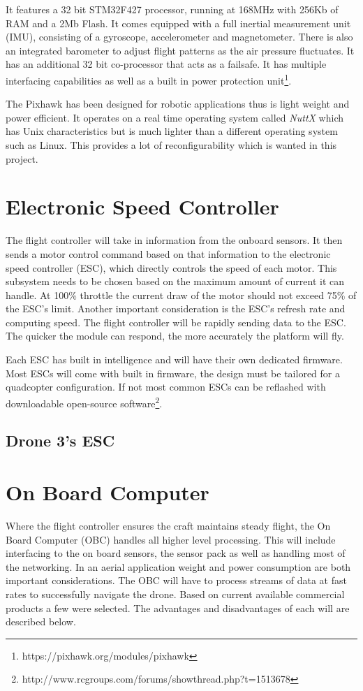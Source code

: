			It features a 32 bit STM32F427 processor, running at 168MHz with 256Kb of RAM and a 2Mb Flash. It comes equipped with a full inertial measurement unit (IMU), consisting of a gyroscope, accelerometer and magnetometer. There is also an integrated barometer to adjust flight patterns as the air pressure fluctuates. It has an additional 32 bit co-processor that acts as a failsafe. It has multiple interfacing capabilities as well as a built in power protection unit\footnote{https://pixhawk.org/modules/pixhawk}. 
			
			The Pixhawk has been designed for robotic applications thus is light weight and power efficient. It operates on a real time operating system called \textit{NuttX} which has Unix characteristics but is much lighter than a different operating system such as Linux. This provides a lot of reconfigurability which is wanted in this project.


		\section{Electronic Speed Controller}
		The flight controller will take in information from the onboard sensors. It then sends a motor control command based on that information to the electronic speed controller (ESC), which directly controls the speed of each motor. This subsystem needs to be chosen based on the maximum amount of current it can handle. At 100\% throttle the current draw of the motor should not exceed 75\% of the ESC's limit. Another important consideration is the ESC's refresh rate and computing speed. The flight controller will be rapidly sending data to the ESC. The quicker the module can respond, the more accurately the platform will fly. 
		
		Each ESC has built in intelligence and will have their own dedicated firmware. Most ESCs will come with built in firmware, the design must be tailored for a quadcopter configuration. If not most common ESCs can be reflashed with downloadable open-source software\footnote{http://www.rcgroups.com/forums/showthread.php?t=1513678}.
		
			\subsection{Drone 3's ESC}
		
		\section{On Board Computer}
		Where the flight controller ensures the craft maintains steady flight, the On Board Computer (OBC) handles all higher level processing. This will include interfacing to the on board sensors, the sensor pack as well as handling most of the networking. In an aerial application weight and power consumption are both important considerations. The OBC will have to process streams of data at fast rates to successfully navigate the drone. Based on current available commercial products a few were selected. The advantages and disadvantages of each will are described below.
			
